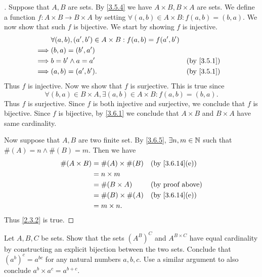 \begin{proof}[]
	Suppose that \(A, B\) are sets.
	By \cref{3.5.4} we have \(A \times B, B \times A\) are sets.
	We define a function \(f : A \times B \to B \times A\) by setting \(\forall (a, b) \in A \times B : f(a, b) = (b, a)\).
	We now show that such \(f\) is bijective.
	We start by showing \(f\) is injective.
	\begin{align*}
		         & \forall (a, b), (a', b') \in A \times B : f(a, b) = f(a', b')                 \\
		\implies & (b, a) = (b', a')                                                             \\
		\implies & b = b' \land a = a'                                           &  & \by{3.5.1} \\
		\implies & (a, b) = (a', b').                                            &  & \by{3.5.1}
	\end{align*}
	Thus \(f\) is injective.
	Now we show that \(f\) is surjective.
	This is true since
	\[
		\forall (b, a) \in B \times A, \exists (a, b) \in A \times B : f(a, b) = (b, a).
	\]
	Thus \(f\) is surjective.
	Since \(f\) is both injective and surjective, we conclude that \(f\) is bijective.
	Since \(f\) is bijective, by \cref{3.6.1} we conclude that \(A \times B\) and \(B \times A\) have same cardinality.

	Now suppose that \(A, B\) are two finite set.
	By \cref{3.6.5}, \(\exists n, m \in \mathbb{N}\) such that \(\#(A) = n \land \#(B) = m\).
	Then we have
	\begin{align*}
		\#(A \times B) & = \#(A) \times \#(B) &  & \text{(by \cref{3.6.14}(e))} \\
		               & = n \times m                                           \\
		               & = \#(B \times A)     &  & \text{(by proof above)}      \\
		               & = \#(B) \times \#(A) &  & \text{(by \cref{3.6.14}(e))} \\
		               & = m \times n.
	\end{align*}
	Thus \cref{2.3.2} is true.
\end{proof}

\begin{ex}\label{ex:3.6.6}
	Let \(A, B, C\) be sets.
	Show that the sets \((A^B)^C\) and \(A^{B \times C}\) have equal cardinality by constructing an explicit bijection between the two sets.
	Conclude that \((a^b)^c = a^{bc}\) for any natural numbers \(a, b, c\).
	Use a similar argument to also conclude \(a^b \times a^c = a^{b+c}\).
\end{ex}

